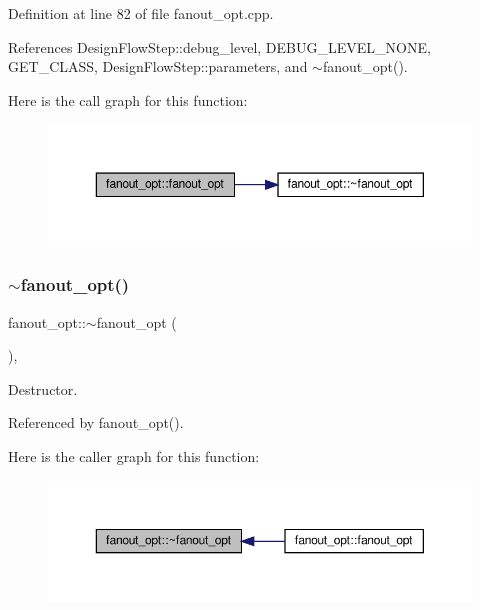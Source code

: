 Definition at line 82 of file fanout\+\_\+opt.\+cpp.



References Design\+Flow\+Step\+::debug\+\_\+level, D\+E\+B\+U\+G\+\_\+\+L\+E\+V\+E\+L\+\_\+\+N\+O\+NE, G\+E\+T\+\_\+\+C\+L\+A\+SS, Design\+Flow\+Step\+::parameters, and $\sim$fanout\+\_\+opt().

Here is the call graph for this function\+:
\nopagebreak
\begin{figure}[H]
\begin{center}
\leavevmode
\includegraphics[width=350pt]{dc/df3/classfanout__opt_ad5937311d51dbb807722c91383f97fba_cgraph}
\end{center}
\end{figure}
\mbox{\label{classfanout__opt_a312077661dabb5414397a0129bde2a2a}} 
\subsubsection{\texorpdfstring{$\sim$fanout\+\_\+opt()}{~fanout\_opt()}}
{\footnotesize\ttfamily fanout\+\_\+opt\+::$\sim$fanout\+\_\+opt (\begin{DoxyParamCaption}{ }\end{DoxyParamCaption})\hspace{0.3cm}{\ttfamily [override]}, {\ttfamily [default]}}



Destructor. 



Referenced by fanout\+\_\+opt().

Here is the caller graph for this function\+:
\nopagebreak
\begin{figure}[H]
\begin{center}
\leavevmode
\includegraphics[width=350pt]{dc/df3/classfanout__opt_a312077661dabb5414397a0129bde2a2a_icgraph}
\end{center}
\end{figure}


